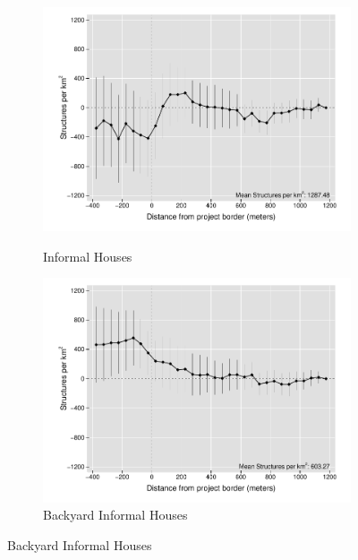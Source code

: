\documentclass[12pt]{article}
\begin{document}
\begin{figure}[t!]
\begin{subfigure}[b]{0.49\textwidth}
        \label{fig:DDDformal}
    \end{subfigure}
    \vskip 1mm \vskip 0pt
    \begin{subfigure}[b]{0.49\textwidth}
        \centering
        \caption[]{\small Informal Houses}
        \vspace{-1mm}
        \includegraphics[width=\textwidth,trim={.5cm .3cm .3cm 0cm}, clip=true]{figures/distplotDDD_bblu_inf_admin.pdf}
        \label{fig:DDDinformal}
    \end{subfigure}
    \hfill
    \begin{subfigure}[b]{0.49\textwidth}  
        \centering
        \caption[]{\small Backyard Informal Houses}  
        \vspace{-1mm}
        \includegraphics[width=\textwidth,trim={.5cm .3cm .3cm 0cm}, clip=true]{figures/distplotDDD_bblu_inf_backyard_admin}

\end{subfigure}
\end{figure}
\end{document}
